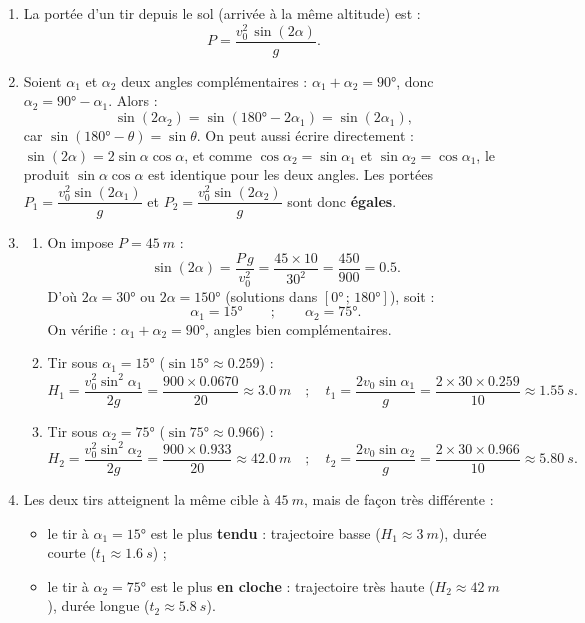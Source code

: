 \documentclass[11pt]{article}
\begin{document}
\begin{corrige}
\begin{enumerate}
\item La portée d'un tir depuis le sol (arrivée à la même altitude) est :
\[ P = \frac{v_0^2\,\sin(2\alpha)}{g}. \]
\item Soient $\alpha_1$ et $\alpha_2$ deux angles complémentaires : $\alpha_1 + \alpha_2 = 90°$, donc $\alpha_2 = 90° - \alpha_1$. Alors :
\[ \sin(2\alpha_2) = \sin(180° - 2\alpha_1) = \sin(2\alpha_1), \]
car $\sin(180° - \theta) = \sin\theta$. On peut aussi écrire directement : $\sin(2\alpha) = 2\sin\alpha\cos\alpha$, et comme $\cos\alpha_2 = \sin\alpha_1$ et $\sin\alpha_2 = \cos\alpha_1$, le produit $\sin\alpha\cos\alpha$ est identique pour les deux angles. Les portées $P_1 = \dfrac{v_0^2\sin(2\alpha_1)}{g}$ et $P_2 = \dfrac{v_0^2\sin(2\alpha_2)}{g}$ sont donc \textbf{égales}.
\item \begin{enumerate}
\item On impose $P = \SI{45}{m}$ :
\[ \sin(2\alpha) = \frac{P\,g}{v_0^2} = \frac{45\times 10}{30^2} = \frac{450}{900} = \num{0,5}. \]
D'où $2\alpha = 30°$ ou $2\alpha = 150°$ (solutions dans $[0°\,;\,180°]$), soit :
\[ \alpha_1 = 15° \qquad ; \qquad \alpha_2 = 75°. \]
On vérifie : $\alpha_1 + \alpha_2 = 90°$, angles bien complémentaires.
\item Tir sous $\alpha_1 = 15°$ ($\sin 15° \approx \num{0,259}$) :
\[ H_1 = \frac{v_0^2\sin^2\alpha_1}{2g} = \frac{900\times \num{0,0670}}{20} \approx \SI{3,0}{m} \quad ; \quad t_1 = \frac{2v_0\sin\alpha_1}{g} = \frac{2\times 30\times \num{0,259}}{10} \approx \SI{1,55}{s}. \]
\item Tir sous $\alpha_2 = 75°$ ($\sin 75° \approx \num{0,966}$) :
\[ H_2 = \frac{v_0^2\sin^2\alpha_2}{2g} = \frac{900\times \num{0,933}}{20} \approx \SI{42,0}{m} \quad ; \quad t_2 = \frac{2v_0\sin\alpha_2}{g} = \frac{2\times 30\times \num{0,966}}{10} \approx \SI{5,80}{s}. \]
\end{enumerate}
\item Les deux tirs atteignent la même cible à $\SI{45}{m}$, mais de façon très différente :
\begin{itemize}
\item le tir à $\alpha_1 = 15°$ est le plus \textbf{tendu} : trajectoire basse ($H_1 \approx \SI{3}{m}$), durée courte ($t_1 \approx \SI{1,6}{s}$) ;
\item le tir à $\alpha_2 = 75°$ est le plus \textbf{en cloche} : trajectoire très haute ($H_2 \approx \SI{42}{m}$), durée longue ($t_2 \approx \SI{5,8}{s}$).

\end{itemize}
\end{enumerate}
\end{corrige}
\end{document}
